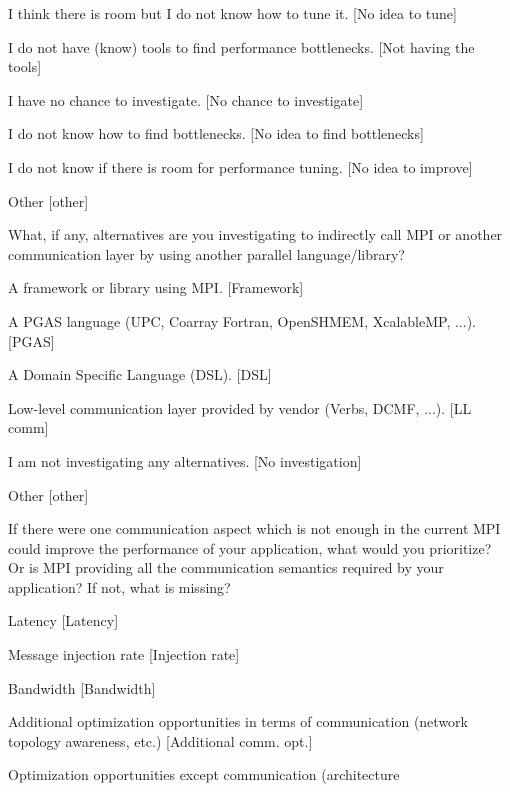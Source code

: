 \documentclass[conference,10pt,letterpaper]{IEEEtran}
\begin{document}
{{\begin{description}
\begin{inparaenum}[{\bf C}1)]
      [No resource]
    \item I think there is room but I do not know how to tune it.
      [No idea to tune]
    \item I do not have (know) tools to find performance bottlenecks.
      [Not having the tools]
    \item I have no chance to investigate.
      [No chance to investigate]
    \item I do not know how to find bottlenecks.
      [No idea to find bottlenecks]
    \item I do not know if there is room for performance tuning.
      [No idea to improve]
    \item Other [other]
    \end{inparaenum}
  \item[Q24*:] What, if any, alternatives are you investigating to
    indirectly call MPI or another communication layer by using another
    parallel language/library? 
    \begin{inparaenum}[{\bf C}1)]
    \item A framework or library using MPI. [Framework]
    \item A PGAS language (UPC, Coarray Fortran, OpenSHMEM, XcalableMP,
      ...). [PGAS]
    \item A Domain Specific Language (DSL). [DSL]
    \item Low-level communication layer provided by vendor (Verbs, DCMF,
      ...). [LL comm]
    \item I am not investigating any alternatives. [No investigation]
    \item Other [other]
    \end{inparaenum}
  \item[Q25:] If there were one communication aspect which is not enough
    in the current MPI could improve the performance of your application,
    what would you prioritize? Or is MPI providing all the communication
    semantics required by your application? If not, what is missing? 
    \begin{inparaenum}[{\bf C}1)]
    \item Latency [Latency]
    \item Message injection rate [Injection rate]
    \item Bandwidth [Bandwidth]
    \item Additional optimization opportunities in terms of communication
      (network topology awareness, etc.) [Additional comm. opt.]
    \item Optimization opportunities except communication (architecture

\end{inparaenum}
\end{description}}}
\end{document}
